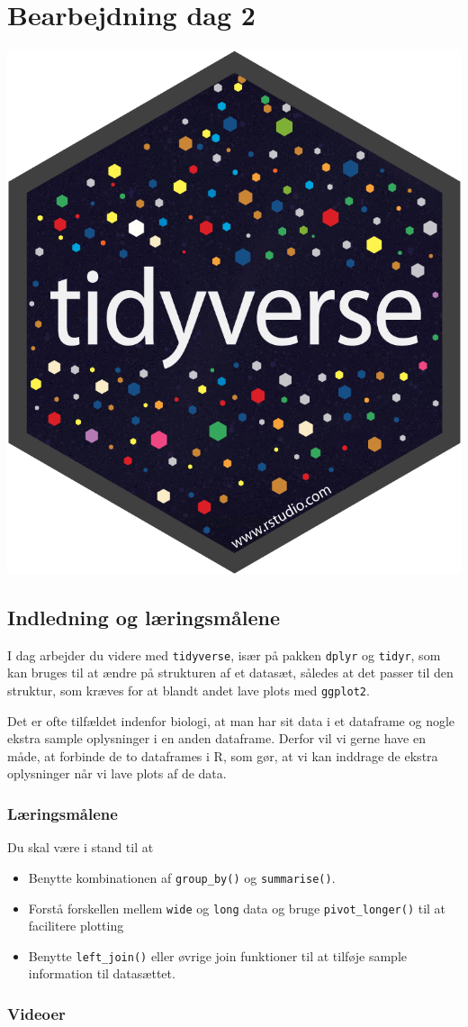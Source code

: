\documentclass[
]{book}
\providecommand{\tightlist}{%
  \setlength{\itemsep}{0pt}\setlength{\parskip}{0pt}}
\begin{document}
\hypertarget{bearbejdning-dag-2}{%
\chapter{Bearbejdning dag 2}\label{bearbejdning-dag-2}}

\includegraphics[width=0.15\linewidth]{plots/hex-tidyverse}

\hypertarget{indledning-og-luxe6ringsmuxe5lene}{%
\section{Indledning og læringsmålene}\label{indledning-og-luxe6ringsmuxe5lene}}

I dag arbejder du videre med \texttt{tidyverse}, især på pakken \texttt{dplyr} og \texttt{tidyr}, som kan bruges til at ændre på strukturen af et datasæt, således at det passer til den struktur, som kræves for at blandt andet lave plots med \texttt{ggplot2}.

Det er ofte tilfældet indenfor biologi, at man har sit data i et dataframe og nogle ekstra sample oplysninger i en anden dataframe. Derfor vil vi gerne have en måde, at forbinde de to dataframes i R, som gør, at vi kan inddrage de ekstra oplysninger når vi lave plots af de data.

\hypertarget{luxe6ringsmuxe5lene-1}{%
\subsection{Læringsmålene}\label{luxe6ringsmuxe5lene-1}}

Du skal være i stand til at

\begin{itemize}
\tightlist
\item
  Benytte kombinationen af \texttt{group\_by()} og \texttt{summarise()}.
\item
  Forstå forskellen mellem \texttt{wide} og \texttt{long} data og bruge \texttt{pivot\_longer()} til at facilitere plotting
\item
  Benytte \texttt{left\_join()} eller øvrige join funktioner til at tilføje sample information til datasættet.
\end{itemize}

\hypertarget{videoer}{%
\subsection{Videoer}\label{videoer}}
\end{document}
